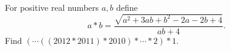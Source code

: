 For positive real numbers $a,b$ define
\[a*b=\dfrac{\sqrt{a^2+3ab+b^2-2a-2b+4}}{ab+4}.\]
Find $\left(\cdots\left(\left(2012*2011\right)*2010\right)*\cdots*2\right)*1$.
